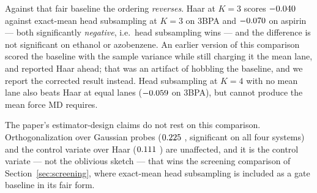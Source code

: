 \documentclass{article}
\begin{document}
Against that fair baseline the ordering \emph{reverses}. Haar at $K{=}3$ scores
$-0.040$ \fsDeltaVsHeadSubCI{} against exact-mean head subsampling at $K{=}3$ on 3BPA and
$-0.070$ \fsDeltaVsHeadSubAspirinCI{} on aspirin --- both significantly
\emph{negative}, i.e.\ head subsampling wins --- and the difference is not significant on ethanol or
azobenzene. An earlier version of this comparison scored the baseline with the sample variance while
still charging it the mean lane, and reported Haar ahead; that was an artifact of hobbling the
baseline, and we report the corrected result instead. Head subsampling at $K{=}4$ with no mean lane
also beats Haar at equal lanes ($-0.059$
\fsDeltaVsHeadSubNoMeanThreeBPACI{} on 3BPA), but cannot produce the mean force MD requires.

The paper's estimator-design claims do not rest on this comparison. Orthogonalization over Gaussian
probes ($0.225$ \fsDeltaOrthoCI{}, significant on all four systems) and the control variate
over Haar ($0.111$ \fsDeltaCVCI{}) are unaffected, and it is the control variate --- not the
oblivious sketch --- that wins the screening comparison of Section~\ref{sec:screening}, where
exact-mean head subsampling is included as a gate baseline in its fair form.


\end{document}
